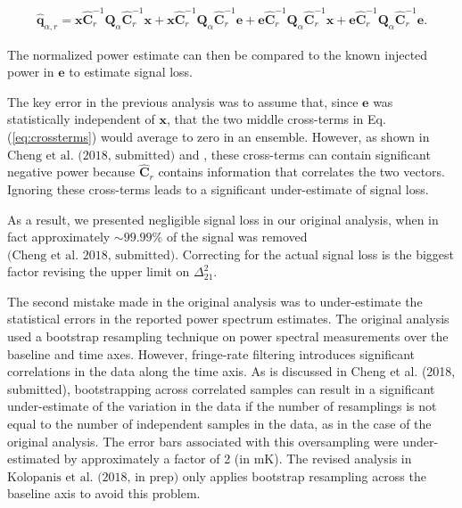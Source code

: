 \documentclass[onecolumn]{emulateapj} \shorttitle{}
\newcommand{\kolopaniscitet}{\textrm{Kolopanis et al. (2018, in prep)}}
\newcommand{\chengcitet}{\textrm{Cheng et al. (2018, submitted)}}
\newcommand{\chengcitep}{\textrm{(Cheng et al. 2018, submitted)}}
\begin{document}
\begin{align}
\widehat{\textbf{q}}_{\alpha,r} ={\mathbf x}\widehat{\textbf{C}}_r^{-1}\textbf{Q}_\alpha \widehat{\textbf{C}}_r^{-1}{\mathbf x}+
{\mathbf x}\widehat{\textbf{C}}_r^{-1}\textbf{Q}_\alpha \widehat{\textbf{C}}_r^{-1}{\mathbf e}+
{\mathbf e}\widehat{\textbf{C}}_r^{-1}\textbf{Q}_\alpha \widehat{\textbf{C}}_r^{-1}{\mathbf x}+
{\mathbf e}\widehat{\textbf{C}}_r^{-1}\textbf{Q}_\alpha \widehat{\textbf{C}}_r^{-1}{\mathbf e}.
\label{eq:crossterms}
\end{align}

\noindent The normalized power estimate can then be compared to the known injected power in $\mathbf{e}$ to estimate signal loss.

The key error in the previous analysis was to assume that, since $\mathbf e$ was statistically independent of $\mathbf x$, that
the two middle cross-terms in Eq. (\ref{eq:crossterms}) would
average to zero in an ensemble. 
However, as shown in $\chengcitet$ and \citet{switzer_et_al2015}, these cross-terms can contain
significant negative power because $\widehat{\textbf{C}}_r$ contains information
that correlates the two vectors. Ignoring these cross-terms leads to a significant under-estimate of signal loss.

As a result, we presented negligible signal loss in our original analysis, when in fact approximately
$\sim{99.99}\%$ of the signal was removed $\chengcitep$. Correcting for the actual signal loss is the biggest factor revising the upper limit
on $\Delta^2_{21}$.

The second mistake made in the original analysis was to under-estimate the statistical errors in the reported power spectrum
estimates.  The original analysis used a bootstrap resampling technique on power spectral measurements over the baseline and time axes.
However, fringe-rate filtering introduces significant correlations in the data
along the time axis.  As is discussed in \chengcitet, bootstrapping across correlated samples can result in a significant under-estimate
of the variation in the data if the number of resamplings is not equal to the number of independent samples in the data, as in the case 
of the original analysis. The error bars associated with this oversampling were under-estimated by approximately a factor of 2 (in $\textrm{mK}$).
The revised analysis in $\kolopaniscitet$ only applies bootstrap resampling across the baseline axis to avoid this problem.
\end{document}
